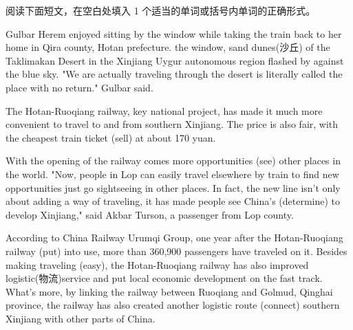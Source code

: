 \documentclass{英语试卷}
\begin{document}
\par 阅读下面短文，在空白处填入 1 个适当的单词或括号内单词的正确形式。\par
\par Gulbar Herem enjoyed sitting by the window while taking the train back to her home in Qira county, Hotan prefecture.  the window, sand dunes(沙丘) of the Taklimakan Desert in the Xinjiang Uygur autonomous region flashed by against the blue sky. "We are actually traveling through the desert  is literally called the place with no return." Gulbar said.\par
\par The Hotan-Ruoqiang railway,  key national project, has made it much more convenient to travel to and from southern Xinjiang. The price is also fair, with the cheapest train ticket  (sell) at about 170 yuan.\par
\par With the opening of the railway comes more opportunities  (see) other places in the world. "Now, people in Lop can easily travel elsewhere by train to find new opportunities  just go sightseeing in other places. In fact, the new line isn't only about adding a way of traveling, it has made people see China's  (determine) to develop Xinjiang," said Akbar Turson, a passenger from Lop county.\par
\par According to China Railway Urumqi Group, one year after the Hotan-Ruoqiang railway  (put) into use, more than 360,900 passengers have traveled on it. Besides making traveling  (easy), the Hotan-Ruoqiang railway has also improved logistic(物流)service and put local economic development on the fast track. What's more, by linking the railway between Ruoqiang and Golmud, Qinghai province, the railway has also created another logistic route  (connect) southern Xinjiang with other parts of China.\par
\end{document}
